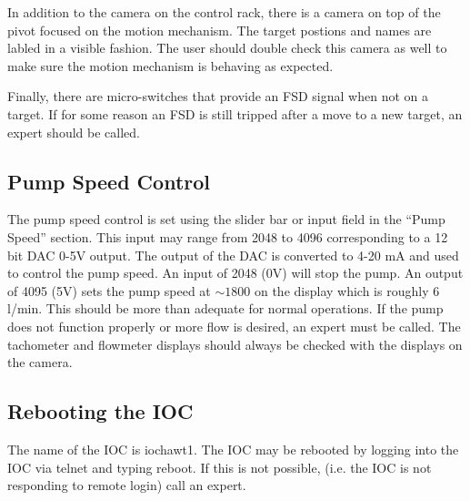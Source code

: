 {In addition to the camera on the control rack, there is a camera on
top of the pivot focused on the motion mechanism. The target postions
and names are labled in a visible fashion. The user should double
check this camera as well to make sure the motion mechanism is behaving
as expected.

Finally, there are micro-switches that provide an FSD signal when
not on a target. If for some reason an FSD is still tripped after
a move to a new target, an expert should be called.


\subsection{Pump Speed Control}

The pump speed control is set using the slider bar or input field
in the {}``Pump Speed'' section. This input may range from 2048
to 4096 corresponding to a 12 bit DAC 0-5V output. The output of the
DAC is converted to 4-20 mA and used to control the pump speed. An
input of 2048 (0V) will stop the pump. An output of 4095 (5V) sets
the pump speed at $\sim 1800$ on the display which is roughly 6 l/min.
This should be more than adequate for normal operations. If the pump
does not function properly or more flow is desired, an expert must
be called. The tachometer and flowmeter displays should always be
checked with the displays on the camera.


\subsection{Rebooting the IOC}

The name of the IOC is iochawt1. The IOC may be rebooted by logging
into the IOC via telnet and typing reboot. If this is not possible,
(i.e. the IOC is not responding to remote login) call an expert.
} %

